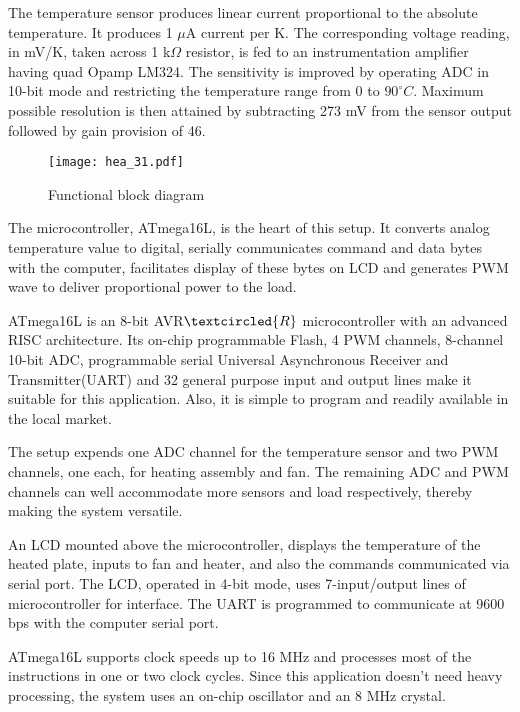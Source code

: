 The temperature sensor produces linear current proportional to the
absolute temperature.  It produces 1 $\mu$A current per K.  The
corresponding voltage reading, in mV/K, taken across 1 k$\Omega$
resistor, is fed to an instrumentation amplifier having quad Opamp
LM324. The sensitivity is improved by operating ADC in 10-bit mode and
restricting the temperature range from 0 to $90^\circ C$. Maximum
possible resolution is then attained by subtracting 273 mV from the
sensor output followed by gain provision of 46.



\begin{figure}
\centering
\texttt{[image: hea\_31.pdf]}
\caption{Functional block diagram}
\label{fig:block-heater}
\end{figure}

The microcontroller, ATmega16L, is the heart of this setup. It
converts analog temperature value to digital, serially communicates
command and data bytes with the computer, facilitates display of these
bytes on LCD and generates PWM wave to deliver proportional power to
the load.

ATmega16L is an 8-bit AVR$\textcircled {R}$ microcontroller with an
advanced RISC architecture. Its on-chip programmable Flash, 4 PWM
channels, 8-channel 10-bit ADC, programmable serial Universal
Asynchronous Receiver and Transmitter(UART) and 32 general purpose
input and output lines make it suitable for this
application. Also, it is simple to program and readily available in
the local market.

The setup expends one ADC channel for the temperature sensor and two
PWM channels, one each, for heating assembly and fan. The remaining
ADC and PWM channels can well accommodate more sensors and load
respectively, thereby making the system versatile. 

An LCD mounted above the microcontroller, displays the temperature of
the heated plate, inputs to fan and heater, and also the commands
communicated via serial port.  The LCD, operated in 4-bit mode, uses
7-input/output lines of microcontroller for interface. The UART is
programmed to communicate at 9600 bps with the computer serial port.

ATmega16L supports clock speeds up to 16 MHz and processes most of the
instructions in one or two clock cycles. Since this application
doesn't need heavy processing, the system uses an on-chip oscillator
and an 8 MHz crystal.

